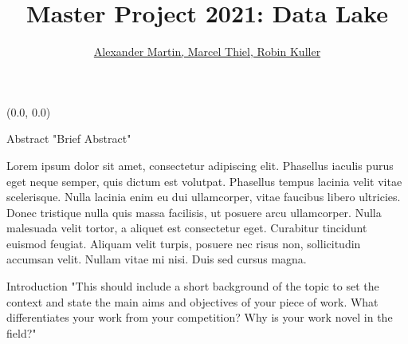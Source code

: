\documentclass[12pt]{beamer}
\title{Master Project 2021: Data Lake}
\author{\hspace{1em}\underline{\vphantom{Wy}Alexander Martin, Marcel Thiel, Robin Kuller}} %
\begin{document}
\begin{textblock}{0.5}(0.0, 0.0)

\begin{block}{Abstract}
"Brief Abstract"

Lorem ipsum dolor sit amet, consectetur adipiscing elit. Phasellus iaculis purus eget neque semper, quis dictum est volutpat. Phasellus tempus lacinia velit vitae scelerisque. Nulla lacinia enim eu dui ullamcorper, vitae faucibus libero ultricies. Donec tristique nulla quis massa facilisis, ut posuere arcu ullamcorper. Nulla malesuada velit tortor, a aliquet est consectetur eget. Curabitur tincidunt euismod feugiat. Aliquam velit turpis, posuere nec risus non, sollicitudin accumsan velit. Nullam vitae mi nisi. Duis sed cursus magna.
\end{block}

\begin{block}{Introduction}
"This should include a short background of the topic to set the context and state the main aims and objectives of your piece of work. What differentiates your work from your competition? Why is your work novel in the field?"


\end{block}
\end{textblock}
\end{document}
